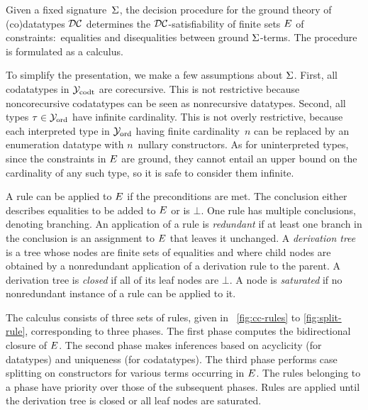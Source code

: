 Given a fixed signature~$\mathrm{\Sigma}$,
the decision procedure for the ground theory of (co)datatypes $\mathcal{DC}$ determines the
$\mathcal{DC}$-satisfiability of finite sets $E$ of constraints:\ equalities
and disequalities between ground $\mathrm{\Sigma}$-terms. The procedure is formulated as a
calculus.

To simplify the presentation, we make a few assumptions about
$\mathrm{\Sigma}$.
First, all codatatypes in $\mathcal{Y}_{\mathrm{codt}}$ are corecursive. This is not restrictive
because noncorecursive codatatypes can be seen as nonrecursive
datatypes.
Second, all types $\tau \in \mathcal{Y}_{\mathrm{ord}}$ have infinite cardinality.
This is not overly restrictive, because each interpreted type in $\mathcal{Y}_{\mathrm{ord}}$
having finite cardinality~$n$
can be replaced by an enumeration datatype with $n$~nullary constructors.
As for uninterpreted types, since the constraints in $E$ are ground, they cannot entail an upper
bound on the cardinality of any such type, so it is safe to consider them infinite.


{
A rule can be applied to $E$ if %
the %
preconditions are met.
The conclusion either describes equalities to be added to $E$
or is $\bot$. %
One rule has multiple conclusions, %
denoting branching.
%
An application of a rule is \emph{redundant} if at least one branch in the
conclusion is an assignment to $E$ that leaves it unchanged.
A \emph{derivation tree} is a %
tree whose nodes are finite sets of
equalities and where child nodes are obtained by a nonredundant application of a
derivation rule to the parent. A derivation tree is \emph{closed} if all of
its leaf nodes are $\bot$. A node is \emph{saturated} if no nonredundant
instance of a rule can be applied to it.

}

The calculus consists of three sets of rules, given in
\figuresname~\ref{fig:cc-rules} to \ref{fig:split-rule}, corresponding to three
phases. The first phase computes the bidirectional closure of $E$. The second
phase makes inferences based on acyclicity (for \hfill datatypes) and uniqueness
(for codatatypes).
The third phase performs case splitting on constructors for
various terms occurring in $E$.
%
The rules belonging to a phase have priority over those of the subsequent
phases. Rules are applied until the derivation tree is closed or all leaf nodes
are saturated.

